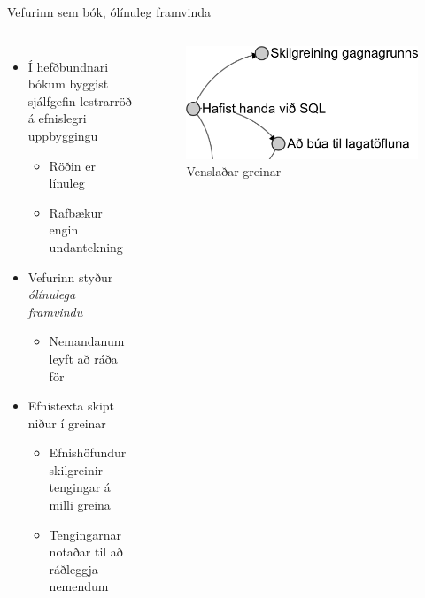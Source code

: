 \documentclass{beamer}
\begin{document}
\begin{frame}{Vefurinn sem bók, ólínuleg framvinda}
    \begin{columns}
        \begin{itemize}
            \item Í hefðbundnari bókum byggist sjálfgefin lestrarröð á efnislegri uppbyggingu
            \begin{itemize}
                \item Röðin er línuleg
                \item Rafbækur engin undantekning
            \end{itemize}
            \item Vefurinn styður \emph{ólínulega framvindu}
            \begin{itemize}
                \item Nemandanum leyft að ráða för
            \end{itemize}
            \item Efnistexta skipt niður í greinar
            \begin{itemize}
                \item Efnishöfundur skilgreinir tengingar á milli greina
                \item Tengingarnar notaðar til að ráðleggja nemendum
            \end{itemize}
        \end{itemize}
        \begin{figure}
            \caption{Venslaðar greinar}
            \includegraphics[width=\textwidth]{relational-sections}
        \end{figure}
    \end{columns}
\end{frame}
\end{document}
